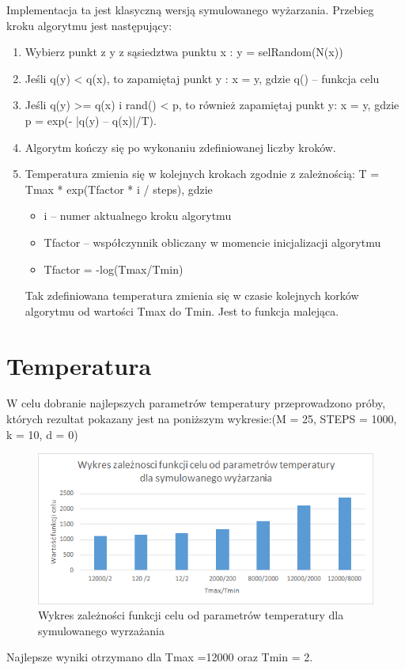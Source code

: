 \documentclass[a4paper]{article}
\begin{document}
Implementacja ta jest klasyczną wersją symulowanego wyżarzania. Przebieg kroku algorytmu jest następujący:
\begin{enumerate}
\item Wybierz punkt z y z sąsiedztwa punktu x : y = selRandom(N(x))
\item Jeśli q(y) < q(x), to zapamiętaj punkt y : x = y, gdzie q() – funkcja celu
\item Jeśli q(y) >= q(x) i rand() < p, to również zapamiętaj punkt y: x = y, gdzie p = exp(- |q(y) – q(x)|/T).
\item Algorytm kończy się po wykonaniu zdefiniowanej liczby kroków.
\item Temperatura zmienia się w kolejnych krokach zgodnie z zależnością:
T = Tmax * exp(Tfactor * i / steps), gdzie
\begin{itemize}
\item  i – numer aktualnego kroku algorytmu
\item Tfactor – współczynnik obliczany w momencie inicjalizacji algorytmu
\item Tfactor = -log(Tmax/Tmin)
\end{itemize}
Tak zdefiniowana temperatura zmienia się w czasie kolejnych korków algorytmu od wartości Tmax do Tmin. Jest to funkcja malejąca.
\end{enumerate}

\section{Temperatura}

W celu dobranie najlepszych parametrów temperatury przeprowadzono próby, których rezultat pokazany jest na poniższym wykresie:(M = 25, STEPS = 1000, k = 10, d = 0)
\begin{figure}[h]
\centering
\includegraphics[width=12cm]{temp}
\caption{Wykres zależności funkcji celu od parametrów temperatury dla symulowanego wyrzażania}
\end{figure}\newline
Najlepsze wyniki otrzymano dla Tmax =12000 oraz Tmin = 2.
\end{document}

